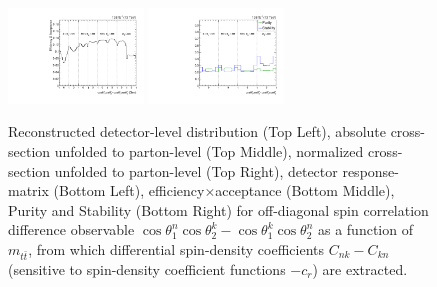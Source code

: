 \begin{figure}[htb]
\begin{center}
 \includegraphics[width=0.32\textwidth]{fig_fullRun2UL/unfolding/combined/TotEff_c_Mnk_mttbar.pdf}
 \includegraphics[width=0.32\textwidth]{fig_fullRun2UL/unfolding/combined/PurStab_c_Mnk_mttbar.pdf} \\
\caption{Reconstructed detector-level distribution (Top Left), absolute cross-section unfolded to parton-level (Top Middle), normalized cross-section unfolded to parton-level (Top Right), detector response-matrix (Bottom Left), efficiency$\times$acceptance (Bottom Middle), Purity and Stability (Bottom Right) for off-diagonal spin correlation difference observable $\cos\theta_{1}^{n}\cos\theta_{2}^{k}-\cos\theta_{1}^{k}\cos\theta_{2}^{n}$ as a function of $m_{t\bar{t}}$, from which differential spin-density coefficients $C_{nk}-C_{kn}$ (sensitive to spin-density coefficient functions $-c_r$) are extracted.}
\label{fig:c_Mnk_mttbar}
\end{center}
\end{figure}
\clearpage
